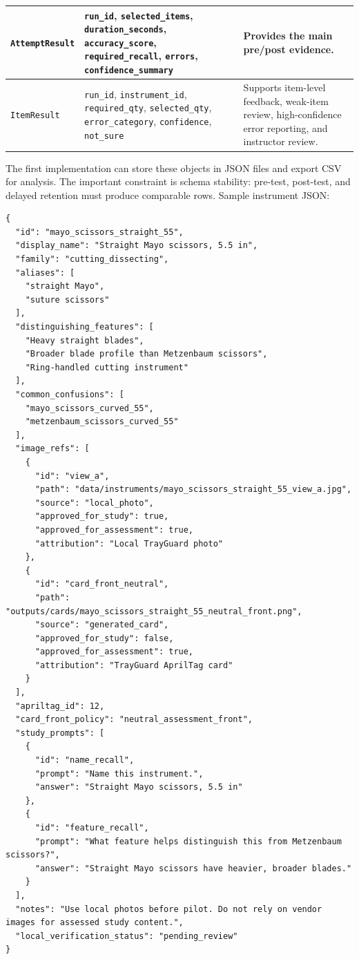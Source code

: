 \documentclass[10pt,a4paper]{article}
\begin{document}
\begin{table}[H]
\begin{tabularx}{\textwidth}{|>{\raggedright\arraybackslash}X|>{\raggedright\arraybackslash}X|>{\raggedright\arraybackslash}X|}
\hline
\texttt{AttemptResult} & \texttt{run\_id}, \texttt{selected\_items}, \texttt{duration\_seconds}, \texttt{accuracy\_score}, \texttt{required\_recall}, \texttt{errors}, \texttt{confidence\_summary} & Provides the main pre/post evidence. \\
\hline
\texttt{ItemResult} & \texttt{run\_id}, \texttt{instrument\_id}, \texttt{required\_qty}, \texttt{selected\_qty}, \texttt{error\_category}, \texttt{confidence}, \texttt{not\_sure} & Supports item-level feedback, weak-item review, high-confidence error reporting, and instructor review. \\
\hline
\end{tabularx}
\end{table}
The first implementation can store these objects in JSON files and export CSV
for analysis. The important constraint is schema stability: pre-test, post-test,
and delayed retention must produce comparable rows.
Sample instrument JSON:
\begin{lstlisting}
{
  "id": "mayo_scissors_straight_55",
  "display_name": "Straight Mayo scissors, 5.5 in",
  "family": "cutting_dissecting",
  "aliases": [
    "straight Mayo",
    "suture scissors"
  ],
  "distinguishing_features": [
    "Heavy straight blades",
    "Broader blade profile than Metzenbaum scissors",
    "Ring-handled cutting instrument"
  ],
  "common_confusions": [
    "mayo_scissors_curved_55",
    "metzenbaum_scissors_curved_55"
  ],
  "image_refs": [
    {
      "id": "view_a",
      "path": "data/instruments/mayo_scissors_straight_55_view_a.jpg",
      "source": "local_photo",
      "approved_for_study": true,
      "approved_for_assessment": true,
      "attribution": "Local TrayGuard photo"
    },
    {
      "id": "card_front_neutral",
      "path": "outputs/cards/mayo_scissors_straight_55_neutral_front.png",
      "source": "generated_card",
      "approved_for_study": false,
      "approved_for_assessment": true,
      "attribution": "TrayGuard AprilTag card"
    }
  ],
  "apriltag_id": 12,
  "card_front_policy": "neutral_assessment_front",
  "study_prompts": [
    {
      "id": "name_recall",
      "prompt": "Name this instrument.",
      "answer": "Straight Mayo scissors, 5.5 in"
    },
    {
      "id": "feature_recall",
      "prompt": "What feature helps distinguish this from Metzenbaum scissors?",
      "answer": "Straight Mayo scissors have heavier, broader blades."
    }
  ],
  "notes": "Use local photos before pilot. Do not rely on vendor images for assessed study content.",
  "local_verification_status": "pending_review"
}
\end{lstlisting}
\end{document}

